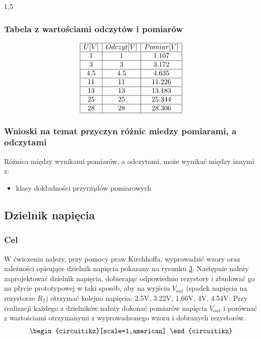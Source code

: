 \documentclass[polish,polish,a4paper]{article}
\begin{document}
\begin{spacing}{1,5}
		\subsubsection*{Tabela z wartościami odczytów i pomiarów}
		
		
		\[
		\begin{array}{|c|c|c|}
		\hline
		U [V]&Odczyt [V]& Pomiar [V]\\
		\hline
		1&1&1.107\\
		\hline
		3&3&3.172\\
		\hline
		4.5&4.5&4.635\\
		\hline
		11&11&11.226\\
		\hline
		13&13&13.183\\
		\hline
		25&25&25.344\\
		\hline
		28&28&28.306\\
		\hline
		\end{array}
		\]
		
		\subsubsection*{Wnioski na temat przyczyn różnic miedzy pomiarami, a odczytami}
				Różnica między wynikami pomiarów, a odczytami, może wynikać między innymi z:
		\begin{itemize}
			\item klasy dokładności przyrządów pomiarowych
		\end{itemize}
		
		\subsection{Dzielnik napięcia}
		\subsubsection*{Cel}
		W ćwiczeniu należy, przy pomocy praw Kirchhoffa, wyprowadzić wzory oraz zależności opisujące dzielnik
		napięcia pokazany na rysunku \hyperref[eq:rysdz]{3}. Następnie należy zaprojektować dzielnik napięcia, dobierając odpowiednio rezystory i zbudować go na płycie prototypowej w taki sposób, aby na wyjściu $ V_{out} $ (spadek napięcia na rezystorze $ R_{2} $) otrzymać kolejno napięcia:
		2.5V, 3.22V, 1.66V, 4V, 4.54V. Przy realizacji każdego z dzielników należy dokonać pomiarów napięcia $ V_{out} $ i
		porównać z wartościami otrzymanymi z wyprowadzonego wzoru i dobranych rezystorów.
		\begin{equation*}
		\label{eq:rysdz}
		\begin{circuitikz}[scale=1,american]
		

\end{circuitikz}
\end{equation*}
\end{spacing}
\end{document}
